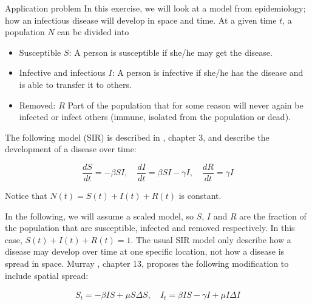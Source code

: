 \clearpage 

\begin{railingbox}{Application problem}
  In this exercise, we will look at a model from epidemiology; how an infectious disease will develop in space and time.
  At a given time \(t\), a population \(N\) can be divided into
  \begin{itemize}
    \item Susceptible \(S\): A person is susceptible if she/he may get the disease.
    \item Infective and infectious \(I\): A person is infective if she/he has the disease and is able to transfer it to others.
    \item Removed: \(R\) Part of the population that for some reason will never again be infected or infect others (immune, isolated from the population or dead).
  \end{itemize}

  The following model (SIR) is described in \cite{murray2002mathematical}, chapter 3, and describe the development of a disease over time:
  
  \begin{equation}
    \frac{dS}{dt}  = -\beta SI, \quad \frac{dI}{dt}  = \beta SI - \gamma I, \quad \frac{dR}{dt}  = \gamma I \label{eq:sir_model} 
  \end{equation}

  Notice that \(N(t) = S(t) + I(t) + R(t)\) is constant.
  
  In the following, we will assume a scaled model, so \(S\), \(I\) and \(R\) are the fraction of the population that are susceptible, infected and removed respectively. In this case, \(S(t) + I(t) + R(t) = 1\).
  The usual SIR model only describe how a disease may develop over time at one specific location, not how a disease is spread in space. Murray \cite{murray2002mathematical}, chapter 13, proposes the following modification to include spatial spread:
  
  \begin{align}
    S_t  = -\beta IS + \mu S \Delta S, \quad I_t = \beta IS - \gamma I + \mu I \Delta I \label{eq:sir_model_space}
  \end{align}


\end{railingbox}
